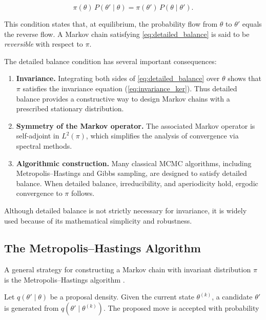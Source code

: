 \documentclass[11pt, twoside]{report}
\begin{document}
\begin{equation}
\pi(\theta)\,P(\theta' \mid \theta)
=
\pi(\theta')\,P(\theta \mid \theta').
\label{eq:detailed_balance}
\end{equation}

This condition states that, at equilibrium, the probability flow from $\theta$ to 
$\theta'$ equals the reverse flow. A Markov chain satisfying 
\eqref{eq:detailed_balance} is said to be \emph{reversible} with respect to $\pi$.

The detailed balance condition has several important consequences:

\begin{enumerate}
    \item \textbf{Invariance.} Integrating both sides of 
    \eqref{eq:detailed_balance} over $\theta$ shows that $\pi$ satisfies the invariance equation (\ref{eq:invariance_ker}). 
    Thus detailed balance provides a constructive way to design Markov chains with a prescribed stationary distribution.
    
    \item \textbf{Symmetry of the Markov operator.} 
    The associated Markov operator is self-adjoint in $L^2(\pi)$, which simplifies 
    the analysis of convergence via spectral methods.
    
    \item \textbf{Algorithmic construction.}
    Many classical MCMC algorithms, including Metropolis--Hastings and Gibbs sampling, 
    are designed to satisfy detailed balance. When detailed balance, irreducibility, 
    and aperiodicity hold, ergodic convergence to $\pi$ follows.
\end{enumerate}

Although detailed balance is not strictly necessary for invariance, it is widely used 
because of its mathematical simplicity and robustness.

\subsection{The Metropolis--Hastings Algorithm}

A general strategy for constructing a Markov chain with invariant distribution $\pi$ 
is the Metropolis--Hastings algorithm \cite{hastings1970}.

Let $q(\theta' \mid \theta)$ be a proposal density. 
Given the current state $\theta^{(k)}$, a candidate $\theta'$ is generated from $q(\theta' \mid \theta^{(k)})$. 
The proposed move is accepted with probability
\end{document}
